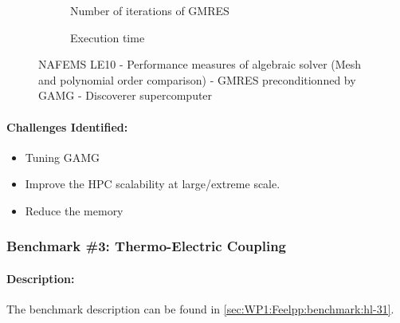 \begin{figure}
  \begin{subfigure}[c]{\textwidth}
    \centering
    \caption{Number of iterations of GMRES}
  \end{subfigure}
  \begin{subfigure}[c]{\textwidth}
    \centering
    \caption{Execution time}
  \end{subfigure}
  \caption{NAFEMS LE10 - Performance measures of algebraic solver
    (Mesh and polynomial order comparison) - GMRES preconditionned by GAMG - Discoverer supercomputer}
    \label{fig:feelpp:wp3:nafems-le10:performance_measures_all}
\end{figure}


\paragraph{Challenges Identified:} %

\begin{itemize}
\item Tuning GAMG
\item Improve the HPC scalability at large/extreme scale.
\item Reduce the memory
\end{itemize}


\subsubsection{Benchmark \#3: Thermo-Electric Coupling}
\label{sec:WP3:Feelpp:benchmark:hl-31}

\paragraph{Description:} %
The benchmark description can be found in
\cref{sec:WP1:Feelpp:benchmark:hl-31}.

